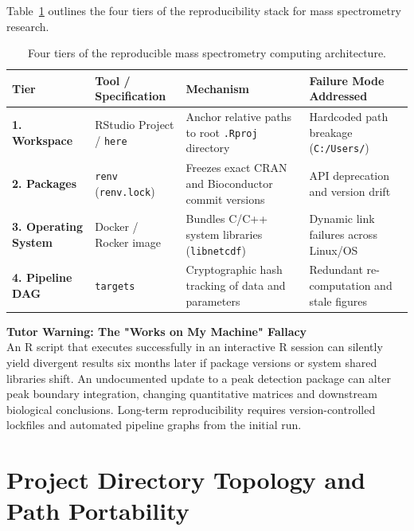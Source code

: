 \documentclass[11pt,twoside,openright]{book}
\begin{document}
Table~\ref{tab:repro_roadmap} outlines the four tiers of the reproducibility stack for mass spectrometry research.

\begin{table}[htbp]
\centering
\caption{Four tiers of the reproducible mass spectrometry computing architecture.}
\label{tab:repro_roadmap}
\small
\begin{tabularx}{\textwidth}{>{\raggedright\arraybackslash}l >{\raggedright\arraybackslash}p{3.8cm} >{\raggedright\arraybackslash}X >{\raggedright\arraybackslash}p{2.8cm}}
\toprule
\textbf{Tier} & \textbf{Tool / Specification} & \textbf{Mechanism} & \textbf{Failure Mode Addressed} \\
\midrule
\textbf{1. Workspace} & RStudio Project / \texttt{here} \cite{muller2020here} & Anchor relative paths to root \texttt{.Rproj} directory & Hardcoded path breakage (\texttt{C:/Users/}) \\
\addlinespace
\textbf{2. Packages} & \texttt{renv} (\texttt{renv.lock}) \cite{ushey2024renv} & Freezes exact CRAN and Bioconductor commit versions & API deprecation and version drift \\
\addlinespace
\textbf{3. Operating System} & Docker / Rocker image \cite{boettiger2015docker, nust2020ten} & Bundles C/C++ system libraries (\texttt{libnetcdf}) & Dynamic link failures across Linux/OS \\
\addlinespace
\textbf{4. Pipeline DAG} & \texttt{targets} \cite{landau2021targets} & Cryptographic hash tracking of data and parameters & Redundant re-computation and stale figures \\
\bottomrule
\end{tabularx}
\end{table}

\begin{notebox}
\textbf{Tutor Warning: The "Works on My Machine" Fallacy}\\[0.4em]
An R script that executes successfully in an interactive R session can silently yield divergent results six months later if package versions or system shared libraries shift. An undocumented update to a peak detection package can alter peak boundary integration, changing quantitative matrices and downstream biological conclusions. Long-term reproducibility requires version-controlled lockfiles and automated pipeline graphs from the initial run.
\end{notebox}

\FloatBarrier
\section{Project Directory Topology and Path Portability}
\label{sec:directory_topology}
\end{document}
